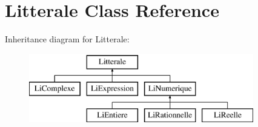 \hypertarget{class_litterale}{}\section{Litterale Class Reference}
\label{class_litterale}
Inheritance diagram for Litterale\+:\begin{figure}[H]
\begin{center}
\leavevmode
\includegraphics[height=3.000000cm]{class_litterale}
\end{center}
\end{figure}

